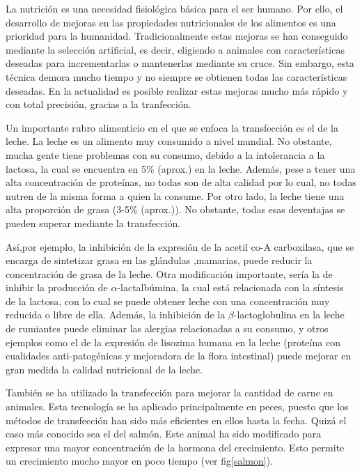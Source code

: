 \documentclass[fleqn,10pt]{SelfArx} %
\begin{document}
La nutrición es una necesidad fisiológica básica para el ser humano\cite{maslow1943theory}. Por ello, el desarrollo de mejoras en las propiedades nutricionales de los alimentos es una prioridad para la humanidad. Tradicionalmente estas mejoras se han conseguido mediante la selección artificial, es decir, eligiendo a animales con características deseadas para incrementarlas o mantenerlas mediante su cruce. Sin embargo, esta técnica demora mucho tiempo y no siempre se obtienen todas las características deseadas. En la actualidad es posible realizar estas mejoras mucho más rápido y con total precisión, gracias a la tranfección.

Un importante rubro alimenticio en el que se enfoca la transfección es el de la leche. La leche es un alimento muy consumido a nivel mundial. No obstante, mucha gente tiene problemas con su consumo, debido a la intolerancia a la lactosa, la cual se encuentra en 5\% (aprox.) en la leche. Además, pese a tener una alta concentración de proteínas, no todas son de alta calidad por lo cual, no todas nutren de la misma forma a quien la consume. Por otro lado, la leche tiene una alta proporción de grasa (3-5\% (aprox.)). No obstante, todas esas deventajas se pueden superar mediante la transfección\cite{yom1993genetic}. 

Así,por ejemplo, la inhibición de la expresión de la acetil co-A carboxilasa, que se encarga de sintetizar grasa en las glándulas ,mamarias, puede reducir la concentración de grasa de la leche. Otra modificación importante, sería la de inhibir la producción de $\alpha$-lactalbúmina, la cual está relacionada con la síntesis de la lactosa, con lo cual se puede obtener leche con una concentración muy reducida o libre de ella. Además, la inhibición de la $\beta$-lactoglobulina en la leche de rumiantes puede eliminar las alergias relacionadas a su consumo, y otros ejemplos como el de la expresión de lisozima humana en la leche (proteína con cualidades anti-patogénicas y mejoradora de la flora intestinal) puede mejorar en gran medida la calidad nutricional de la leche\cite{yom1993genetic, pintado1998transgenesis, maga2006consumption}.

También se ha utilizado la transfección para mejorar la cantidad de carne en animales. Esta tecnología se ha aplicado principalmente en peces, puesto que los métodos de transfección han sido más eficientes en ellos hasta la fecha. Quizá el caso más conocido sea el del salmón. Este animal ha sido modificado para expresar una mayor concentración de la hormona del crecimiento. Esto permite un crecimiento mucho mayor en poco tiempo (ver fig\ref{salmon})\cite{berkowitz1994transgenic, ledford2013transgenic}.
\end{document}
